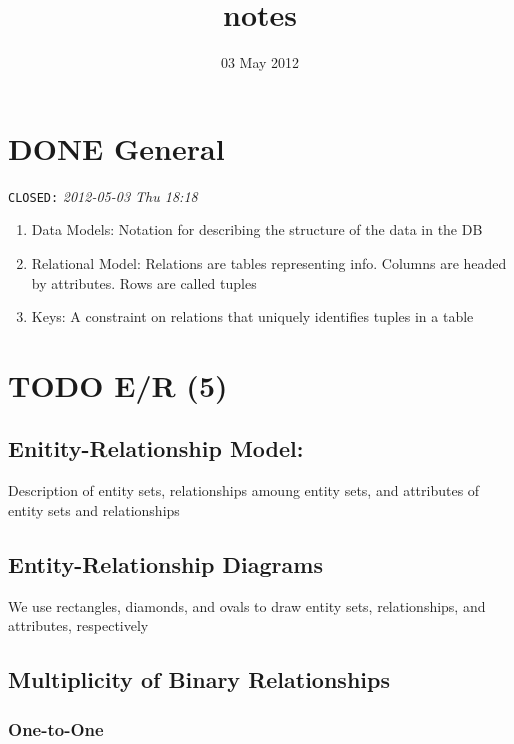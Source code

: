 \documentclass[11pt]{article}
\title{notes}
\author{}
\date{03 May 2012}
\begin{document}
\maketitle

\setcounter{tocdepth}{3}
\tableofcontents
\vspace*{1cm}
\section{\textbf{DONE} General}
\label{sec-1}

  \texttt{CLOSED:} \textit{2012-05-03 Thu 18:18}\newline
\begin{enumerate}
\item Data Models: Notation for describing the structure of the data in
     the DB
\item Relational Model: Relations are tables representing info. Columns
     are headed by attributes. Rows are called tuples
\item Keys: A constraint on relations that uniquely identifies tuples
     in a table
\end{enumerate}
\section{\textbf{TODO} E/R (5)}
\label{sec-2}

\subsection{Enitity-Relationship Model:}
\label{sec-2.1}

   Description of entity sets, relationships amoung entity sets, and
   attributes of entity sets and relationships
\subsection{Entity-Relationship Diagrams}
\label{sec-2.2}

   We use rectangles, diamonds, and ovals to draw entity sets,
   relationships, and attributes, respectively
\subsection{Multiplicity of Binary Relationships}
\label{sec-2.3}

\subsubsection{One-to-One}
\label{sec-2.3.1}
\end{document}
